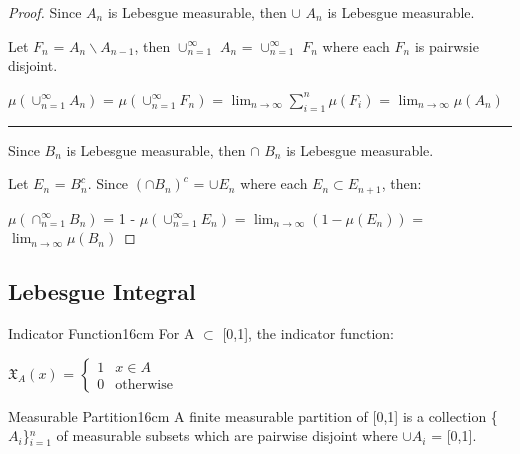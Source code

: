     \begin{proof}
        Since $A_n$ is Lebesgue measurable, then $\cup$ $A_n$ is
        Lebesgue measurable.

        Let $F_n$ = $A_n \backslash A_{n-1}$, then
        $\cup_{n=1}^{\infty}$ $A_n$ = $\cup_{n=1}^{\infty}$ $F_n$
        where each $F_n$ is pairwsie disjoint.

        \hspace{0.5cm}
        $\mu(\cup_{n=1}^{\infty} A_n)$
        = $\mu(\cup_{n=1}^{\infty} F_n)$
        = $\lim_{n \rightarrow \infty} \sum_{i=1}^n \mu(F_i)$
        = $\lim_{n \rightarrow \infty} \mu(A_n)$

        \rule[0.1cm]{16.7cm}{0.01cm}

        Since $B_n$ is Lebesgue measurable, then $\cap$ $B_n$ is
        Lebesgue measurable.

        Let $E_n$ = $B_n^c$. Since $(\cap B_n)^c$ = $\cup E_n$
        where each $E_n \subset E_{n+1}$, then:

        \hspace{0.5cm}
        $\mu(\cap_{n=1}^{\infty} B_n)$
        = 1 - $\mu(\cup_{n=1}^{\infty} E_n)$
        = $\lim_{n \rightarrow \infty} (1 - \mu(E_n))$
        = $\lim_{n \rightarrow \infty} \mu(B_n)$
    \end{proof}

    \newpage





\subsection{ Lebesgue Integral }

    \begin{definition}{Indicator Function}{16cm}
        For A $\subset$ [0,1], the {\color{lblue} indicator function}:

        \hspace{0.5cm}
        $\mathfrak{X}_A(x)$ =
        $\begin{cases}
            1 & x \in A \\
            0 & \text{otherwise}
        \end{cases}$
    \end{definition}

    \vspace{0.5cm}



    \begin{definition}{Measurable Partition}{16cm}
        A finite {\color{lblue} measurable partition} of [0,1] is a
        collection \{$A_i$\}$_{i=1}^n$ of measurable subsets
        which are pairwise disjoint where $\cup A_i$ = [0,1].
    \end{definition}

